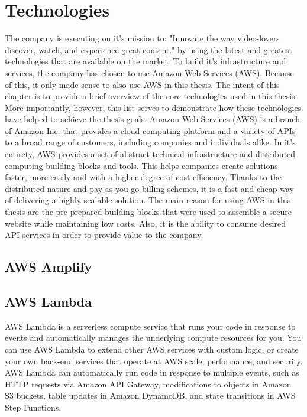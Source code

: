 \documentclass[12pt,oneside]{fithesis2}
\begin{document}
    \section{Technologies}
    The company is executing on it's mission to: "Innovate the way video-lovers discover, watch, and experience great content."\cite{24i-mission} by using the latest and greatest technologies that are available on the market. To build it's infrastructure and services, the company has chosen to use Amazon Web Services (AWS). Because of this, it only made sense to also use AWS in this thesis.
    The intent of this chapter is to provide a brief overview of the core technologies used in this thesis. More importantly, however, this list serves to demonstrate how these technologies have helped to achieve the thesis goals.
    Amazon Web Services (AWS) is a branch of Amazon Inc. that provides a cloud computing platform and a variety of APIs to a broad range of customers, including companies and individuals alike. In it's entirety, AWS provides a set of abstract technical infrastructure and distributed computing building blocks and tools. This helps companies create solutions faster, more easily and with a higher degree of cost efficiency. \cite{what-is-aws} Thanks to the distributed nature and pay-as-you-go billing schemes, it is a fast and cheap way of delivering a highly scalable solution. \cite{aws-pricing}
    \newline\newline
    The main reason for using AWS in this thesis are the pre-prepared building blocks that were used to assemble a secure website while maintaining low costs. Also, it is the ability to consume desired API services in order to provide value to the company.
    \subsection*{AWS Amplify}
    \subsection*{AWS Lambda}
    AWS Lambda is a serverless compute service that runs your code in response to events and automatically manages the underlying compute resources for you. You can use AWS Lambda to extend other AWS services with custom logic, or create your own back-end services that operate at AWS scale, performance, and security. AWS Lambda can automatically run code in response to multiple events, such as HTTP requests via Amazon API Gateway, modifications to objects in Amazon S3 buckets, table updates in Amazon DynamoDB, and state transitions in AWS Step Functions.
\end{document}
